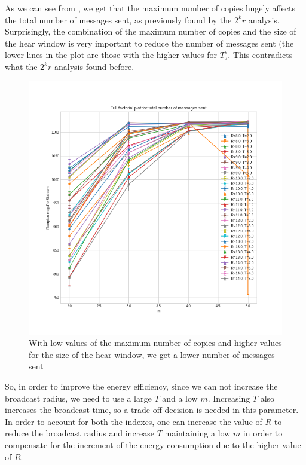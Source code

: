 As we can see from , we get that the maximum number of
copies hugely affects the total number of messages sent, as previously found by
the \(2^{k}r\) analysis. Surprisingly, the combination of the maximum number of
copies and the size of the hear window is very important to reduce the number of
messages sent (the lower lines in the plot are those with the higher values for
\(T\)). This contradicts what the \(2^{k}r\) analysis found before.

\begin{figure}
	\centering
	\includegraphics[width=\textwidth]{img/hd/messages-m-ffplot}
	\caption{With low values of the maximum number of copies and higher
	values for the size of the hear window, we get a lower number of
	messages sent}\label{fig:hdmessagesff}
\end{figure}

So, in order to improve the energy efficiency, since we can not increase the
broadcast radius, we need to use a large \(T\) and a low \(m\). Increasing
\(T\) also increases the broadcast time, so a trade-off decision is needed in
this parameter. In order to account for both the indexes, one can increase the
value of \(R\) to reduce the broadcast radius and increase \(T\) maintaining a
low \(m\) in order to compensate for the increment of the energy consumption due
to the higher value of \(R\).

